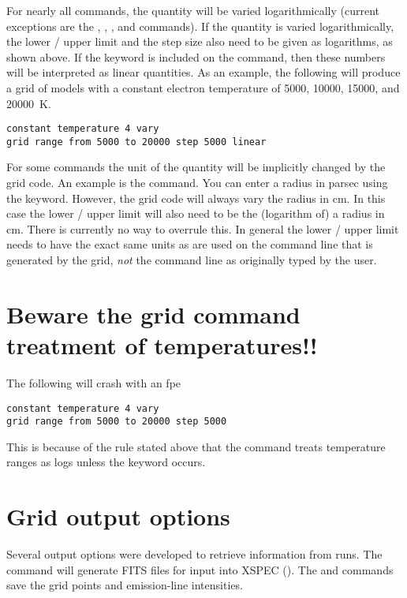 For nearly all commands, the quantity will be varied logarithmically (current
exceptions are the , ,
, and  commands). If the quantity is varied
logarithmically, the lower / upper limit and the step size also need to be
given as logarithms, as shown above. If the keyword  is
included on the  command, then these numbers will be
interpreted as linear quantities. As an example, the following will produce a
grid of models with a constant electron temperature of 5000, 10000, 15000, and
20000~K.
\begin{verbatim}
constant temperature 4 vary
grid range from 5000 to 20000 step 5000 linear
\end{verbatim}

For some commands the unit of the quantity will be implicitly changed by the
grid code. An example is the  command. You can enter a
radius in parsec using the  keyword. However, the grid code
will always vary the radius in cm. In this case the lower / upper limit will
also need to be the (logarithm of) a radius in cm. There is currently no way
to overrule this. In general the lower / upper limit needs to have the exact
same units as are used on the command line that is generated by the grid,
\emph{not} the command line as originally typed by the user.

\section{Beware the grid command treatment of temperatures!!}
\label{sec:GridTemperatureGotcha}
The following will crash with an fpe
\begin{verbatim}
constant temperature 4 vary
grid range from 5000 to 20000 step 5000
\end{verbatim}
This is because of the rule stated above that the  command
treats temperature ranges as logs unless the keyword
 occurs.  

\section{Grid output options}

Several  output
options were developed to
retrieve information from  runs.
The  command
will generate FITS files for input into XSPEC (\citealp{Porter2006}).
The
 and  commands
save the grid points and emission-line intensities.

